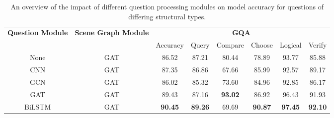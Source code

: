 \begin{table}[htbp]
\centering
\begin{footnotesize}
\begin{tabular}{cc|c|ccccc}
\toprule
\multirow{3}{0.1\textwidth}{\textbf{Question Module}} & \multirow{3}{0.1\textwidth}{\textbf{Scene Graph Module}} & \multicolumn{6}{c}{\multirow{2}{*}{\textbf{GQA}}}                                                   \\
                                          &                                              & \multicolumn{6}{c}{}                                                                                \\ \cmidrule(l){3-8} 
                                          &                                              & Accuracy       & Query          & Compare        & Choose         & Logical        & Verify         \\ \midrule
None                                      & GAT                                          & 86.52          & 87.21          & 80.44          & 78.89          & 93.77          & 85.88          \\
CNN                                       & GAT                                          & 87.35          & 86.86          & 67.66          & 85.99          & 92.57          & 89.17          \\
GCN                                       & GAT                                          & 86.02          & 85.32          & 73.60          & 84.96          & 92.85          & 86.17          \\
GAT                                       & GAT                                          & 89.43          & 87.16          & \textbf{93.02} & 86.92          & 96.43          & 91.93          \\
\midrule
BiLSTM                                    & GAT                                          & \textbf{90.45} & \textbf{89.26} & 69.69          & \textbf{90.87} & \textbf{97.45} & \textbf{92.10} \\ \bottomrule
\end{tabular}
\end{footnotesize}
\caption[Question processing module ablation performance for questions of differing structural types.]{An overview of the impact of different question processing modules on model accuracy for questions of differing structural types.}
\label{table:question_ablation_structural}
\end{table}

